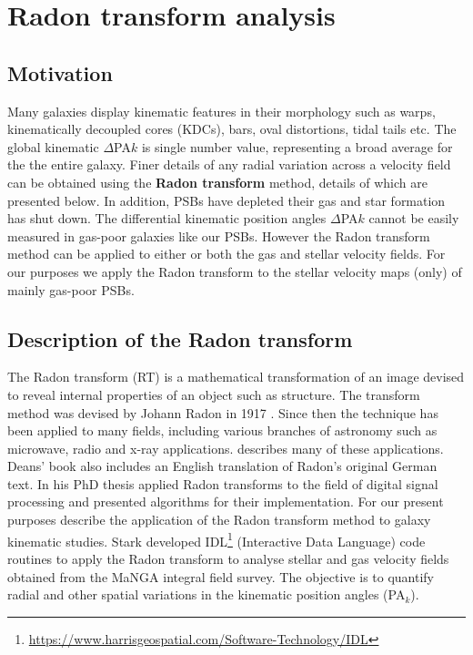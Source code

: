 \section{Radon transform analysis}
\label{sec:methods-II-Radon}

\subsection{Motivation}
\label{sec:motivation}

Many galaxies display kinematic features in their morphology such as warps, kinematically decoupled cores (KDCs), bars, oval distortions, tidal tails etc. The global kinematic $\Delta$PA${k}$ is single number value, representing a broad average for the the entire galaxy. Finer details of any radial variation across a velocity field can be obtained using the \textbf{Radon transform} method, details of which are presented below. In addition, PSBs have depleted their gas and star formation has shut down. The differential kinematic position angles $\Delta$PA${k}$ cannot be easily measured in gas-poor galaxies like our PSBs. However the Radon transform method can be applied to either or both the gas and stellar velocity fields. For our purposes we apply the Radon transform to the stellar velocity maps (only) of mainly gas-poor PSBs. 

\subsection{Description of the Radon transform}

The Radon transform (RT) is a mathematical transformation of an image devised to reveal internal properties of an object such as structure. The transform method was devised by Johann Radon in 1917 \citep{radon1917determination}. Since then the technique has been applied to many fields, including various branches of astronomy such as microwave, radio and x-ray applications. \citet{deans2007radon} describes many of these applications. Deans' book also includes an English translation of Radon's original German text. In his PhD thesis \cite{7910dc8d5b654c90ac4bc94c67d06f01} applied Radon transforms to the field of digital signal processing and presented algorithms for their implementation. For our present purposes \cite{2018MNRAS.480.2217S} describe the application of the Radon transform method to galaxy kinematic studies. Stark developed IDL\footnote{\href{https://www.harrisgeospatial.com/Software-Technology/IDL}{https://www.harrisgeospatial.com/Software-Technology/IDL}} (Interactive Data Language) code routines to apply the Radon transform to analyse stellar and gas velocity fields obtained from the MaNGA integral field survey. The objective is to quantify radial and other spatial variations in the kinematic position angles (PA$_{k}$).

